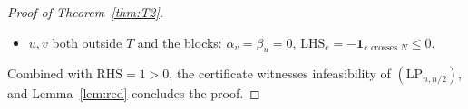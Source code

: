 \documentclass[10pt,a4paper]{amsart}
\newcommand{\LHS}{\mathrm{LHS}}
\newcommand{\RHS}{\mathrm{RHS}}
\begin{document}
\begin{proof}[Proof of Theorem~\ref{thm:T2}]
\begin{itemize}
\item[(vi)] $u,v$ both outside $T$ and the blocks:
$\alpha_v=\beta_u=0$, $\LHS_e=-\mathbf{1}_{e\text{ crosses }N}\le 0$.
\end{itemize}
Combined with $\RHS=1>0$, the certificate witnesses infeasibility of
$(\mathrm{LP}_{n,n/2})$, and Lemma~\ref{lem:red} concludes the proof.
\end{proof}
\end{document}

